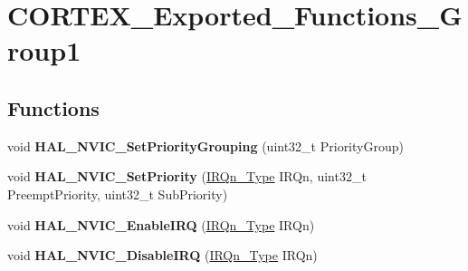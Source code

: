 \hypertarget{group___c_o_r_t_e_x___exported___functions___group1}{\section{C\-O\-R\-T\-E\-X\-\_\-\-Exported\-\_\-\-Functions\-\_\-\-Group1}
\label{group___c_o_r_t_e_x___exported___functions___group1}
}
\subsection*{Functions}
\begin{DoxyCompactItemize}
\item 
\hypertarget{group___c_o_r_t_e_x___exported___functions___group1_gad9be53e08b1498adea006e5e037f238f}{void {\bfseries H\-A\-L\-\_\-\-N\-V\-I\-C\-\_\-\-Set\-Priority\-Grouping} (uint32\-\_\-t Priority\-Group)}\label{group___c_o_r_t_e_x___exported___functions___group1_gad9be53e08b1498adea006e5e037f238f}

\item 
\hypertarget{group___c_o_r_t_e_x___exported___functions___group1_ga8581a82025a4780efd00876a66e3e91b}{void {\bfseries H\-A\-L\-\_\-\-N\-V\-I\-C\-\_\-\-Set\-Priority} (\hyperlink{group___peripheral__interrupt__number__definition_ga7e1129cd8a196f4284d41db3e82ad5c8}{I\-R\-Qn\-\_\-\-Type} I\-R\-Qn, uint32\-\_\-t Preempt\-Priority, uint32\-\_\-t Sub\-Priority)}\label{group___c_o_r_t_e_x___exported___functions___group1_ga8581a82025a4780efd00876a66e3e91b}

\item 
\hypertarget{group___c_o_r_t_e_x___exported___functions___group1_gaaad4492c1b25e006d69948a15790352a}{void {\bfseries H\-A\-L\-\_\-\-N\-V\-I\-C\-\_\-\-Enable\-I\-R\-Q} (\hyperlink{group___peripheral__interrupt__number__definition_ga7e1129cd8a196f4284d41db3e82ad5c8}{I\-R\-Qn\-\_\-\-Type} I\-R\-Qn)}\label{group___c_o_r_t_e_x___exported___functions___group1_gaaad4492c1b25e006d69948a15790352a}

\item 
\hypertarget{group___c_o_r_t_e_x___exported___functions___group1_ga50ca6290e068821cb84aa168f3e13967}{void {\bfseries H\-A\-L\-\_\-\-N\-V\-I\-C\-\_\-\-Disable\-I\-R\-Q} (\hyperlink{group___peripheral__interrupt__number__definition_ga7e1129cd8a196f4284d41db3e82ad5c8}{I\-R\-Qn\-\_\-\-Type} I\-R\-Qn)}\label{group___c_o_r_t_e_x___exported___functions___group1_ga50ca6290e068821cb84aa168f3e13967}


\end{DoxyCompactItemize}
